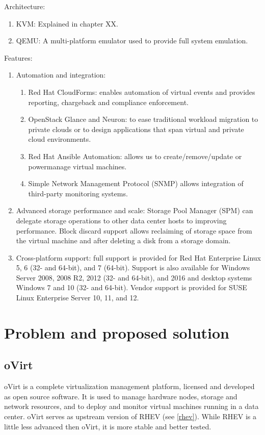 Architecture:
\begin{enumerate}
\item KVM: Explained in chapter XX.
\item QEMU: A multi-platform emulator used to provide full system emulation.
\end{enumerate}

Features:
\begin{enumerate}
\item Automation and integration:
\begin{enumerate}
\item Red Hat CloudForms: enables automation of virtual events and provides reporting, chargeback and compliance enforcement.
\item OpenStack Glance and Neuron: to ease traditional workload migration to private clouds or to design applications that span virtual and private cloud environments.
\item Red Hat Ansible Automation: allows us to create/remove/update or powermanage virtual machines.
\item Simple Network Management Protocol (SNMP) allows integration of third-party monitoring systems.
\end{enumerate}
\item Advanced storage performance and scale: Storage Pool Manager (SPM) can delegate storage operations to other data center hosts to improving performance. Block discard support allows reclaiming of storage space from the virtual machine and after deleting a disk from a storage domain.
\item Cross-platform support: full support is provided for Red Hat Enterprise Linux 5, 6 (32- and 64-bit), and 7 (64-bit). Support is also available for Windows Server 2008, 2008 R2, 2012 (32- and 64-bit), and 2016 and desktop systems Windows 7 and 10 (32- and 64-bit). Vendor support is provided for SUSE Linux Enterprise Server 10, 11, and 12.
\end{enumerate}


\chapter{Problem and proposed solution}

\section{oVirt}
oVirt is a complete virtualization management platform, licensed and developed as open source software. It is used to manage hardware nodes, storage and network resources, and to deploy and monitor virtual machines running in a data center. oVirt serves as upstream version of RHEV (see \ref{rhev}). While RHEV is a little less advanced then oVirt, it is more stable and better tested.

